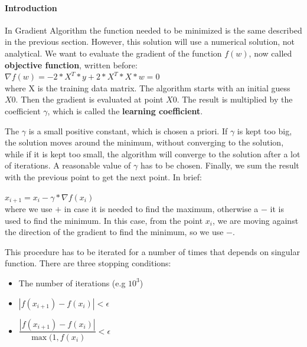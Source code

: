 \documentclass[12pt,a4paper,oneside]{article}
\begin{document}
	\paragraph{Introduction}In Gradient Algorithm the function needed to be minimized is the same described in the previous section. However, this solution will use a numerical solution, not analytical.
	We want to evaluate the gradient of the function $f(w)$, now called \textbf{objective function}, written before:\\
	$\nabla f(w)=-2*X^{T}*y+2*X^{T}*X*w=0 $\\
	
	where X is the training data matrix. The algorithm starts with an initial guess $X0$. Then the gradient is evaluated at point $X0$. The result is multiplied by the coefficient $\gamma$, which is called the \textbf{learning coefficient}.
	
	The $\gamma$ is a small positive constant, which is chosen a priori. If $\gamma$ is kept too big, the solution moves around the minimum, without converging to the solution, while if it is kept too small, the algorithm will converge to the solution after a lot of iterations. A reasonable value of $\gamma$ has to be chosen. Finally, we sum the result with the previous point to get the next point. In brief:
	
	$x_{i+1}=x_{i}-\gamma*\nabla f(x_{i})$\\
	where we use $+$ in case it is needed to find the maximum, otherwise a $-$ it is used to find the minimum. In this case, from the point $x_{i}$, we are moving against the direction of the gradient to find the minimum, so we use $-$.
	
	This procedure has to be iterated for a number of times that depends on singular function. There are three stopping conditions:
	\begin{itemize}
		\item The number of iterations (e.g $10^{3}$)
		\item $|f(x_{i+1})-f(x_{i})|<\epsilon$
		\item $\dfrac{|f(x_{i+1})-f(x_{i})|}{\max(1,f(x_{i}) }<\epsilon$
	\end{itemize}
	
\end{document}

